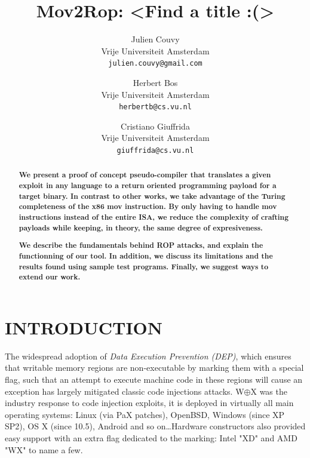 \documentclass[10pt,twocolumn]{article}
\begin{document}
\author{
        Julien Couvy\\
        Vrije Universiteit Amsterdam\\
        \texttt{julien.couvy@gmail.com}
        \and
        Herbert Bos\\
        Vrije Universiteit Amsterdam\\
        \texttt{herbertb@cs.vu.nl}
        \and
        Cristiano Giuffrida\\
        Vrije Universiteit Amsterdam\\
        \texttt{giuffrida@cs.vu.nl}
}
\title{\Huge Mov2Rop: <Find a title :(>\vspace{.75em}}
\maketitle

\begin{abstract}

  \textbf{We present a proof of concept pseudo-compiler that translates a given
    exploit in any language to a return oriented programming payload for a
    target binary. In contrast to other works, we take advantage of the Turing
    completeness of the x86 mov instruction. By only having to handle mov
    instructions instead of the entire ISA, we reduce the complexity of crafting
  payloads while keeping, in theory, the same degree of expresiveness.}

  \textbf{We describe the fundamentals behind ROP attacks, and explain the
    functionning of our tool. In addition, we discuss its limitations and the
    results found using  sample test programs. Finally, we suggest ways to extend
  our work.}

\end{abstract}

\section{INTRODUCTION}

The widespread adoption of \textit{Data Execution Prevention (DEP)}, which
ensures that writable memory regions are non-executable by marking them with a
special flag, such that an attempt to execute machine code in these regions
will cause an exception has largely mitigated classic code injections attacks.
W$\oplus$X was the industry response to code injection exploits, it is deployed
in virtually all main operating systems: Linux (via PaX patches), OpenBSD,
Windows (since XP SP2), OS X (since 10.5), Android and so on\ldots Hardware
constructors also provided easy support with an extra flag dedicated to the
marking: Intel "XD" and AMD "WX" to name a few.
\end{document}
